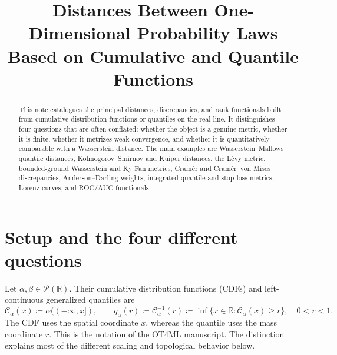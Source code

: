 \documentclass[11pt]{article}
\title{Distances Between One-Dimensional Probability Laws\\
Based on Cumulative and Quantile Functions}
\author{}
\date{}
\newcommand{\RR}{\mathbb R}
\newcommand{\Pp}{\mathcal P}
\newcommand{\al}{\alpha}
\newcommand{\be}{\beta}
\newcommand{\Cc}{\mathcal C}
\newcommand{\cumul}[1]{\Cc_{#1}}
\newcommand{\eqdef}{\coloneqq}
\begin{document}
\maketitle

\begin{abstract}
This note catalogues the principal distances, discrepancies, and rank
functionals built from cumulative distribution functions or quantiles on the
real line.  It distinguishes four questions that are often conflated: whether
the object is a genuine metric, whether it is finite, whether it metrizes weak
convergence, and whether it is quantitatively comparable with a Wasserstein
distance.  The main examples are Wasserstein--Mallows quantile distances,
Kolmogorov--Smirnov and Kuiper distances, the L\'evy metric, bounded-ground
Wasserstein and Ky Fan metrics, Cram\'er and Cram\'er--von Mises
discrepancies, Anderson--Darling weights, integrated quantile and stop-loss
metrics, Lorenz curves, and ROC/AUC functionals.
\end{abstract}

\tableofcontents

\section{Setup and the four different questions}

Let $\al,\be\in\Pp(\RR)$.  Their cumulative distribution functions
(CDFs) and left-continuous generalized quantiles are
\begin{equation}\label{eq:cdf-quantile}
 \cumul{\al}(x)\eqdef\al(({-\infty},x]),
 \qquad
 q_\al(r)\eqdef\cumul{\al}^{-1}(r)
 \eqdef\inf\{x\in\RR:\cumul{\al}(x)\geq r\},
 \quad 0<r<1.
\end{equation}
The CDF uses the spatial coordinate $x$, whereas the quantile uses the mass
coordinate $r$.  This is the notation of the OT4ML manuscript.  The
distinction explains most of the different scaling and
topological behavior below.
\end{document}
